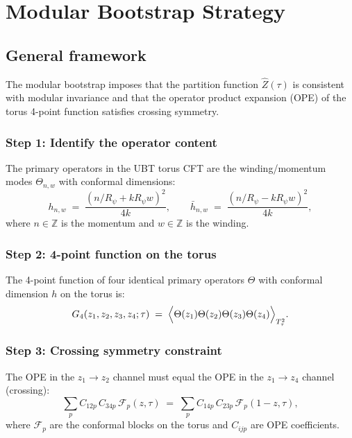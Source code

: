 \documentclass[12pt,a4paper]{article}
\theoremstyle{definition}
\theoremstyle{remark}
\begin{document}
\section{Modular Bootstrap Strategy}
\label{sec:bootstrap}

\subsection{General framework}

The modular bootstrap \cite{Rattazzi2008,Rychkov2016} imposes that the
partition function $\hat{Z}(\tau)$ is consistent with modular invariance and
that the operator product expansion (OPE) of the torus 4-point function
satisfies crossing symmetry.

\subsubsection*{Step 1: Identify the operator content}

The primary operators in the UBT torus CFT are the winding/momentum modes
$\Theta_{n,w}$ with conformal dimensions:
\[
  h_{n,w} \;=\; \frac{(n/R_\psi + kR_\psi w)^2}{4k},
  \qquad
  \bar{h}_{n,w} \;=\; \frac{(n/R_\psi - kR_\psi w)^2}{4k},
\]
where $n \in \mathbb{Z}$ is the momentum and $w \in \mathbb{Z}$ is the winding.

\subsubsection*{Step 2: 4-point function on the torus}

The 4-point function of four identical primary operators $\Theta$ with
conformal dimension $h$ on the torus is:
\[
  G_4(z_1,z_2,z_3,z_4;\tau) \;=\;
  \Bigl\langle
    \Theta(z_1)\Theta(z_2)\Theta(z_3)\Theta(z_4)
  \Bigr\rangle_{T^2_\tau}.
\]

\subsubsection*{Step 3: Crossing symmetry constraint}

The OPE in the $z_1 \to z_2$ channel must equal the OPE in the $z_1 \to z_4$
channel (crossing):
\begin{equation}
\label{eq:crossing}
  \sum_{p} C_{12p}\,C_{34p}\,\mathcal{F}_p(z,\tau)
  \;=\;
  \sum_{p} C_{14p}\,C_{23p}\,\mathcal{F}_p(1-z,\tau),
\end{equation}
where $\mathcal{F}_p$ are the conformal blocks on the torus and $C_{ijp}$ are
OPE coefficients.
\end{document}
